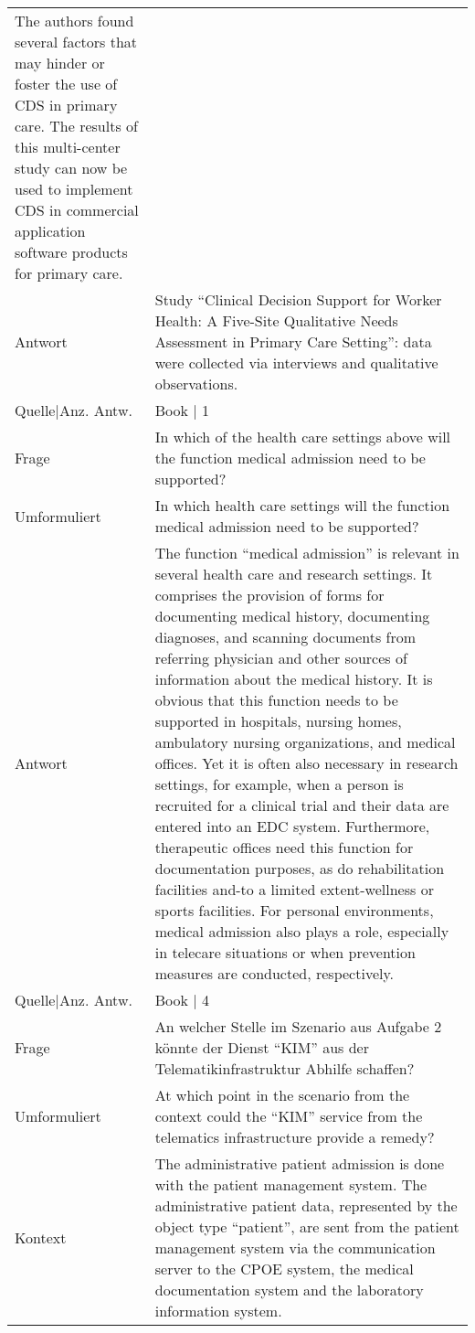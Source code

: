 {\begin{landscape}
\begin{longtable}{p{3cm}p{}}
    The authors found several factors that may hinder or foster the use of CDS in primary care.
    The results of this multi-center study can now be used to implement CDS in commercial application software products for primary care.\\
    Antwort & Study ``Clinical Decision Support for Worker Health: A Five-Site Qualitative Needs Assessment in Primary Care Setting'': data were collected via interviews and qualitative observations.\\
    Quelle|Anz. Antw. &  Book  | 1 \\
    \midrule
    Frage & In which of the health care settings above will the function medical admission need to be supported? \\
    Umformuliert & In which health care settings will the function medical admission need to be supported? \\
    Antwort & The function ``medical admission'' is relevant in several health care and research settings.
    It comprises the provision of forms for documenting medical history, documenting diagnoses, and scanning documents from referring physician and other sources of information about the medical history.
    It is obvious that this function needs to be supported in hospitals, nursing homes, ambulatory nursing organizations, and medical offices.
    Yet it is often also necessary in research settings, for example, when a person is recruited for a clinical trial and their data are entered into an EDC system.
    Furthermore, therapeutic offices need this function for documentation purposes, as do rehabilitation facilities and-to a limited extent-wellness or sports facilities.
    For personal environments, medical admission also plays a role, especially in telecare situations or when prevention measures are conducted, respectively.\\
    Quelle|Anz. Antw. &  Book  | 4 \\
    \midrule
    Frage & An welcher Stelle im Szenario aus Aufgabe 2 könnte der Dienst ``KIM'' aus der Telematikinfrastruktur Abhilfe schaffen? \\
    Umformuliert & At which point in the scenario from the context could the ``KIM'' service from the telematics infrastructure provide a remedy? \\
    Kontext & The administrative patient admission is done with the patient management system.
    The administrative patient data, represented by the object type ``patient'', are sent from the patient management system via the communication server to the CPOE system, the medical documentation system and the laboratory information system.

\end{longtable}
\end{landscape}}
